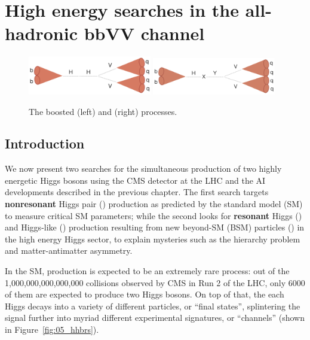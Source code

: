 \chapter{High energy \HH searches in the all-hadronic bbVV channel}
\label{sec:05_hh}

\begin{figure}[h!]
\centering
\includegraphics[width=0.48\textwidth]{figures/05-HH/HHbbVV-cartoon.png}
\includegraphics[width=0.48\textwidth]{figures/05-HH/XHYbbVV-cartoon.png}
\caption{The boosted \HHbbVVq (left) and \XHYbbVVq (right) processes.}
\label{fig:05_hhbbvv}
\end{figure}


\section{Introduction}

We now present two searches for the simultaneous production of two highly energetic Higgs bosons using the CMS detector at the LHC and the AI developments described in the previous chapter.
The first search targets \textbf{nonresonant} Higgs pair (\HH) production as predicted by the standard model (SM) to measure critical SM parameters; while the second looks for \textbf{resonant} Higgs (\PH) and Higgs-like (\PY) production resulting from new beyond-SM (BSM) particles (\PX) in the high energy Higgs sector, to explain mysteries such as the hierarchy problem and matter-antimatter asymmetry.

In the SM, \HH production is expected to be an extremely rare process: out of the 1,000,000,000,000,000 collisions observed by CMS in Run 2 of the LHC, only 6000 of them are expected to produce two Higgs bosons.
On top of that, the each Higgs decays into a variety of different particles, or ``final states'', splintering the signal further into myriad different experimental signatures, or ``channels'' (shown in Figure~\ref{fig:05_hhbrs}).

